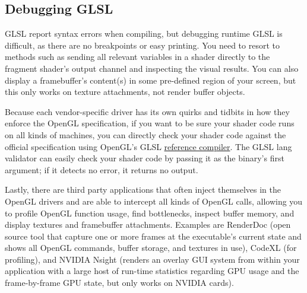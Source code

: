 \documentclass[table, xcdraw]{article}%
\begin{document}
\subsection{Debugging GLSL}

GLSL report syntax errors when compiling, but debugging runtime GLSL is difficult, as there are no breakpoints or easy printing. You need to resort to methods such as sending all relevant variables in a shader directly to the fragment shader's output channel and inspecting the visual results. You can also display a framebuffer's content(s) in some pre-defined region of your screen, but this only works on texture attachments, not render buffer objects.

Because each vendor-specific driver has its own quirks and tidbits in how they enforce the OpenGL specification, if you want to be sure your shader code runs on all kinds of machines, you can directly check your shader code against the official specification using OpenGL's GLSL \href{https://www.khronos.org/opengles/sdk/tools/Reference-Compiler/}{reference compiler}. The GLSL lang validator can easily check your shader code by passing it as the binary's first argument; if it detects no error, it returns no output.

Lastly, there are third party applications that often inject themselves in the OpenGL drivers and are able to intercept all kinds of OpenGL calls, allowing you to profile OpenGL function usage, find bottlenecks, inspect buffer memory, and display textures and framebuffer attachments. Examples are RenderDoc (open source tool that capture one or more frames at the executable's current state and shows all OpenGL commands, buffer storage, and textures in use), CodeXL (for profiling), and NVIDIA Nsight (renders an overlay GUI system from within your application with a large host of run-time statistics regarding GPU usage and the frame-by-frame GPU state, but only works on NVIDIA cards).
\end{document}

